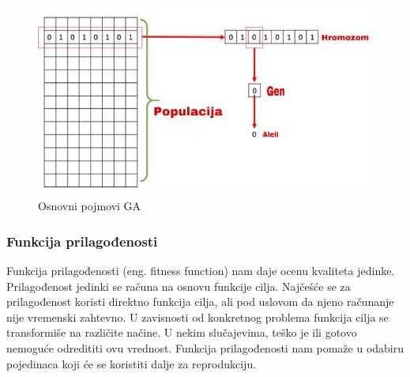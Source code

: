 \documentclass[a4paper]{article}
\begin{document}
\begin{figure}[h]
    \centering
    \includegraphics[scale=0.3]{oznake.jpg}
    \caption{Osnovni pojmovi GA}
    \label{fig:parts}
\end{figure}

\subsubsection{Funkcija prilagođenosti}
Funkcija prilagođenosti (eng. fitness function) nam daje ocenu kvaliteta jedinke. Prilagođenost jedinki se računa na osnovu funkcije cilja. Najčešće se za prilagođenost koristi direktno funkcija cilja, ali pod uslovom da njeno računanje nije vremenski zahtevno. U zavisnosti od konkretnog problema funkcija cilja se transformiše na različite načine. U nekim slučajevima, teško je ili gotovo nemoguće odredititi ovu vrednost. Funkcija prilagođenosti nam pomaže u odabiru pojedinaca koji će se koristiti dalje za reprodukciju.
\end{document}
